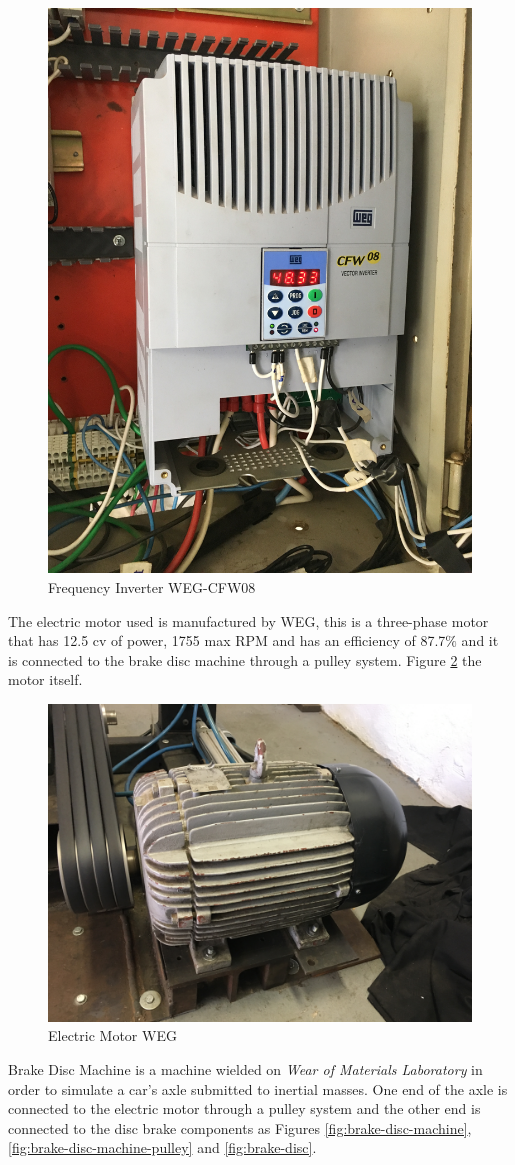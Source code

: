 		\begin{figure}[htbp]
			\centering
			\includegraphics[width=.5\textwidth, angle=270]{figuras/fig-frequency-inverter}
			\caption{Frequency Inverter WEG-CFW08}
			\label{fig:frequency-inverter}
		\end{figure}
		\par

		The electric motor used is manufactured by WEG, this is a three-phase motor that has 12.5 cv of power, 1755 max RPM and has an efficiency of 87.7$\%$ and it is connected to the brake disc machine through a pulley system. Figure \ref{fig:electric-motor} the motor itself.

		\begin{figure}[htbp]
			\centering
			\includegraphics[width=.5\textwidth]{figuras/fig-electric-motor}
			\caption{Electric Motor WEG}
			\label{fig:electric-motor}
		\end{figure}
		\par

		Brake Disc Machine is a machine wielded on \textit{Wear of Materials Laboratory} in order to simulate a car's axle submitted to inertial masses. One end of the axle is connected to the electric motor through a pulley system and the other end is connected to the disc brake components as Figures \ref{fig:brake-disc-machine}, \ref{fig:brake-disc-machine-pulley} and \ref{fig:brake-disc}.

